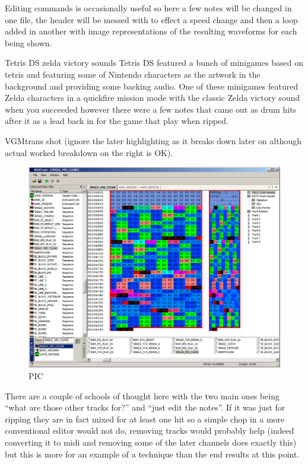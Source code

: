 \documentclass[
]{book}
\begin{document}
Editing commands is occasionally useful so here a few notes will be changed in one file, the header will be messed with to effect a speed change and then a loop added in another with image representations of the resulting waveforms for each being shown.

Tetris DS zelda victory sounds Tetris DS featured a bunch of minigames based on tetris and featuring some of Nintendo characters as the artwork in the background and providing some backing audio. One of these minigames featured Zelda characters in a quickfire mission mode with the classic Zelda victory sound when you succeeded however there were a few notes that came out as drum hits after it as a lead back in for the game that play when ripped.

VGMtrans shot (ignore the later highlighting as it breaks down later on although actual worked breakdown on the right is OK).

\begin{figure}
\centering
\includegraphics{images/153_home_fast6191_romhackingguide_unrenamed_fil___original_borders_romhackguideSDATSSEQedit_1.png}
\caption{PIC}
\end{figure}

There are a couple of schools of thought here with the two main ones being ``what are those other tracks for?'' and ``just edit the notes''. If it was just for ripping they are in fact mixed for at least one hit so a simple chop in a more conventional editor would not do, removing tracks would probably help (indeed converting it to midi and removing some of the later channels does exactly this) but this is more for an example of a technique than the end results at this point.
\end{document}
